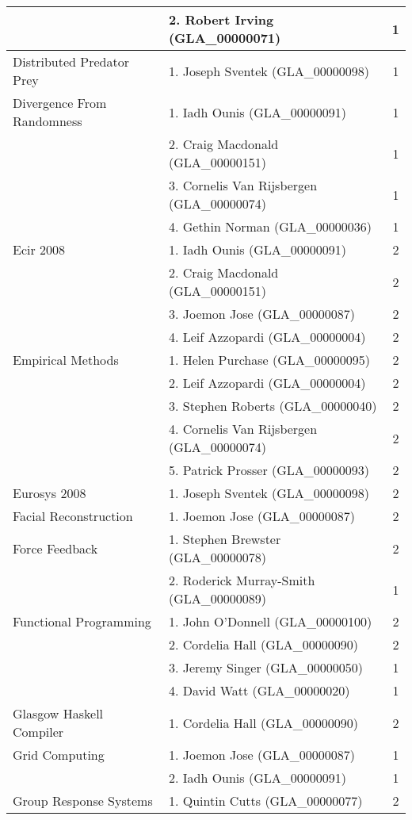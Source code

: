 \begin{longtable}{|l|l|c|}
\hline  & 2. Robert Irving (GLA\_00000071) & 1 \\ 
\hline Distributed Predator Prey & 1. Joseph Sventek (GLA\_00000098) & 1 \\ 
\hline Divergence From Randomness & 1. Iadh Ounis (GLA\_00000091) & 1 \\ 
\hline  & 2. Craig Macdonald (GLA\_00000151) & 1 \\ 
\hline  & 3. Cornelis Van Rijsbergen (GLA\_00000074) & 1 \\ 
\hline  & 4. Gethin Norman (GLA\_00000036) & 1 \\ 
\hline Ecir 2008 & 1. Iadh Ounis (GLA\_00000091) & 2 \\ 
\hline  & 2. Craig Macdonald (GLA\_00000151) & 2 \\ 
\hline  & 3. Joemon Jose (GLA\_00000087) & 2 \\ 
\hline  & 4. Leif Azzopardi (GLA\_00000004) & 2 \\ 
\hline Empirical Methods & 1. Helen Purchase (GLA\_00000095) & 2 \\ 
\hline  & 2. Leif Azzopardi (GLA\_00000004) & 2 \\ 
\hline  & 3. Stephen Roberts (GLA\_00000040) & 2 \\ 
\hline  & 4. Cornelis Van Rijsbergen (GLA\_00000074) & 2 \\ 
\hline  & 5. Patrick Prosser (GLA\_00000093) & 2 \\ 
\hline Eurosys 2008 & 1. Joseph Sventek (GLA\_00000098) & 2 \\ 
\hline Facial Reconstruction & 1. Joemon Jose (GLA\_00000087) & 2 \\ 
\hline Force Feedback & 1. Stephen Brewster (GLA\_00000078) & 2 \\ 
\hline  & 2. Roderick Murray-Smith (GLA\_00000089) & 1 \\ 
\hline Functional Programming & 1. John O'Donnell (GLA\_00000100) & 2 \\ 
\hline  & 2. Cordelia Hall (GLA\_00000090) & 2 \\ 
\hline  & 3. Jeremy Singer (GLA\_00000050) & 1 \\ 
\hline  & 4. David Watt (GLA\_00000020) & 1 \\ 
\hline Glasgow Haskell Compiler & 1. Cordelia Hall (GLA\_00000090) & 2 \\ 
\hline Grid Computing & 1. Joemon Jose (GLA\_00000087) & 1 \\ 
\hline  & 2. Iadh Ounis (GLA\_00000091) & 1 \\ 
\hline Group Response Systems & 1. Quintin Cutts (GLA\_00000077) & 2 \\ 

\end{longtable}
